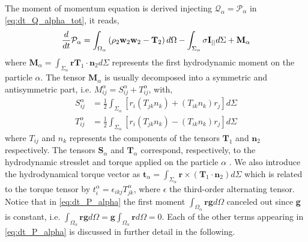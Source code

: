 The moment of momentum equation is derived injecting $\mathcal{Q}_\alpha = \mathcal{P}_\alpha$ in \ref{eq:dt_Q_alpha_tot}, it reads, 
\begin{equation}
    \frac{d}{d t} \mathcal{P}_\alpha
    = \int_{\Omega_\alpha} \left(
        \rho_2  \textbf{w}_2 \textbf{w}_2 
        - \mathbf{T}_2
    \right) d\Omega
    - \int_{\Sigma_\alpha} 
        \sigma \textbf{I}_{||}
    d\Sigma
    + \textbf{M}_\alpha
    \label{eq:dt_P_alpha}
\end{equation}
where $\textbf{M}_\alpha = \int_{\Sigma_\alpha} \textbf{r}\mathbf{T}_1\cdot \textbf{n}_2d\Sigma $ represents the first hydrodynamic moment on the particle $\alpha$.
The tensor $\textbf{M}_\alpha$ is usually decomposed into a symmetric and antisymmetric part, i.e. $M^\alpha_{ij} 
= S^\alpha_{ij}+T^\alpha_{ij}$, with,
\begin{align}
    \label{eq:M_decomposition}
    S^\alpha_{ij} 
    &= \frac{1}{2}  \int_{\Sigma_\alpha} \left[
        r_i(T_{jk}n_k)
        + (T_{ik}n_k)r_j
        \right]d\Sigma
    \\
    T^\alpha_{ij}
    &= \frac{1}{2}  \int_{\Sigma_\alpha} \left[
        r_i(T_{jk}n_k)
        - (T_{ik}n_k)r_j
    \right]d\Sigma \nonumber
\end{align}
where $T_{ij}$ and $n_k$ represents the components of the tensors $\textbf{T}_1$ and $\textbf{n}_2$ respectively. 
The tensors $\textbf{S}_\alpha$ and $\textbf{T}_\alpha$ correspond, respectively, to the hydrodynamic stresslet and torque applied on the particle $\alpha$ \citep{guazzelli2011,kim2013microhydrodynamics}. 
We also introduce the hydrodynamical torque vector as $\textbf{t}_\alpha = \int_{\Sigma_\alpha} \textbf{r} \times (\mathbf{T}_1\cdot \textbf{n}_2) d\Sigma$ which is related to the torque tensor by $t^\alpha_i = \epsilon_{ikj} T^\alpha_{jk}$, where $\epsilon$ the third-order alternating tensor. 
Notice that in \ref{eq:dt_P_alpha} the first moment  $\int_{\Omega_\alpha} \textbf{rg} d\Omega$ canceled out since \textbf{g} is constant, i.e. $\int_{\Omega_\alpha} \textbf{rg} d\Omega =\textbf{g}\int_{\Omega_\alpha} \textbf{r} d\Omega=0$. 
Each of the other terms appearing in \ref{eq:dt_P_alpha} is discussed in further detail in the following.

